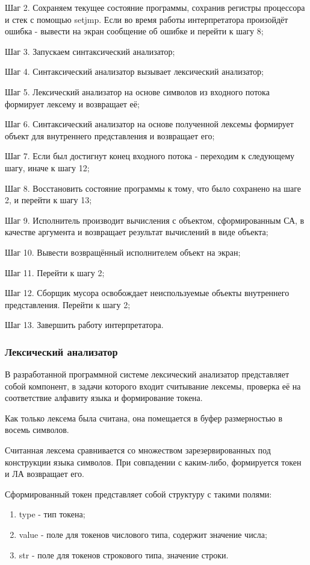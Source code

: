 Шаг 2. Сохраняем текущее состояние программы, сохранив регистры процессора и стек с помощью setjmp. Если во время работы интерпретатора произойдёт ошибка - вывести на экран сообщение об ошибке и перейти к шагу 8;

Шаг 3. Запускаем синтаксический анализатор;

Шаг 4. Синтаксический анализатор вызывает лексический анализатор;

Шаг 5. Лексический анализатор на основе символов из входного потока формирует лексему и возвращает её;

Шаг 6. Синтаксический анализатор на основе полученной лексемы формирует объект для внутреннего представления и возвращает его;

Шаг 7. Если был достигнут конец входного потока - переходим к следующему шагу, иначе к шагу 12;

Шаг 8. Восстановить состояние программы к тому, что было сохранено на шаге 2, и перейти к шагу 13;

Шаг 9. Исполнитель производит вычисления с объектом, сформированным СА, в качестве аргумента и возвращает результат вычислений в виде объекта;

Шаг 10. Вывести возвращённый исполнителем объект на экран;

Шаг 11. Перейти к шагу 2;

Шаг 12. Сборщик мусора освобождает неиспользуемые объекты внутреннего представления. Перейти к шагу 2;

Шаг 13. Завершить работу интерпретатора.

\subsubsection{Лексический анализатор}
В разработанной программной системе лексический анализатор представляет собой компонент, в задачи которого входит считывание лексемы, проверка её на соответствие алфавиту языка и формирование токена.

Как только лексема была считана, она помещается в буфер размерностью в восемь символов.

Считанная лексема сравнивается со множеством зарезервированных под конструкции языка символов. При совпадении с каким-либо, формируется токен и ЛА возвращает его.


Сформированный токен представляет собой структуру с такими полями:
\begin{enumerate}
	\item type - тип токена;
	\item value - поле для токенов числового типа, содержит значение числа;
	\item str - поле для токенов строкового типа, значение строки.
\end{enumerate}

